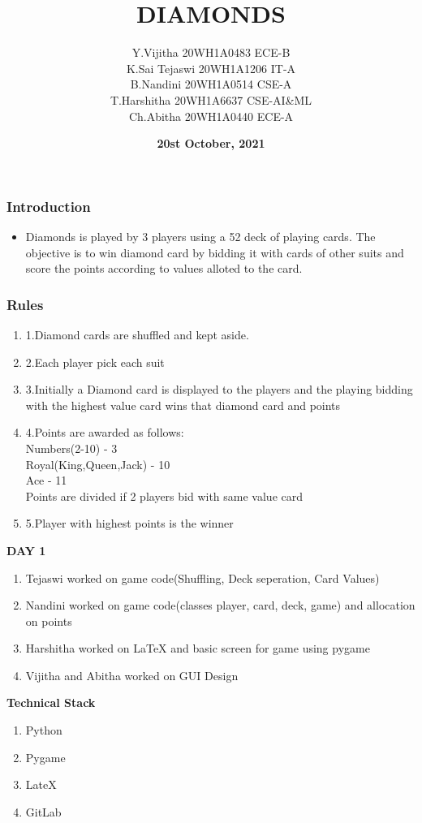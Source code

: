 \documentclass[12pt]{beamer}
\title{\textbf{DIAMONDS}}
\author[Bvrith]{Y.Vijitha 20WH1A0483 ECE-B\\K.Sai Tejaswi 20WH1A1206 IT-A\\ B.Nandini 20WH1A0514 CSE-A\\ T.Harshitha 20WH1A6637 CSE-AI&ML\\ Ch.Abitha 20WH1A0440 ECE-A}
\date{\textbf{20st October, 2021}}
\begin{document}
    \begin{frame}
        \titlepage
    \end{frame}
    \begin{frame}
	\frametitle{\LARGE{\textbf{Introduction}}}
        \begin{itemize}
    	    \item Diamonds is played by 3 players using a 52 deck of playing cards. The objective is to win diamond card by bidding it with cards of other suits and score the points according to values alloted to the card.
    	\end{itemize}
    \end{frame}
    \begin{frame}
	\frametitle{\LARGE{\textbf{Rules}}}
    	\begin{enumerate}[label = \arabic*)]
    	    \item 1.Diamond cards are shuffled and kept aside.
    	    \item 2.Each player pick each suit
    	    \item 3.Initially  a Diamond card is displayed to the players and the playing bidding with the highest value card wins that diamond card and points
    	    \item 4.Points are awarded as follows:\\
    	    Numbers(2-10) - 3\\
    	    Royal(King,Queen,Jack) - 10\\
    	    Ace - 11\\
    	    Points are divided if 2 players bid with same value card
    	    \item 5.Player with highest points is the winner  
    	    
    	\end{enumerate}
    \end{frame}
    
    \begin{frame}{\LARGE{\textbf{DAY 1}}}
        \begin{enumerate}[label = \arabic*)]
            \item Tejaswi worked on game code(Shuffling, Deck seperation, Card Values) 
            \item Nandini worked on game code(classes player, card, deck, game) and allocation on points
            \item Harshitha worked on LaTeX and basic screen for game using pygame
            \item Vijitha and Abitha worked on GUI Design
        \end{enumerate}
    \end{frame}
    
    \begin{frame}{\LARGE{\textbf{Technical Stack }}}
        \begin{enumerate}[label = \arabic*)]
            \item \large{Python}
            \item \large{Pygame}
            \item \large{LateX}
            \item \large{GitLab}
        \end{enumerate}
    \end{frame}
\end{document}
